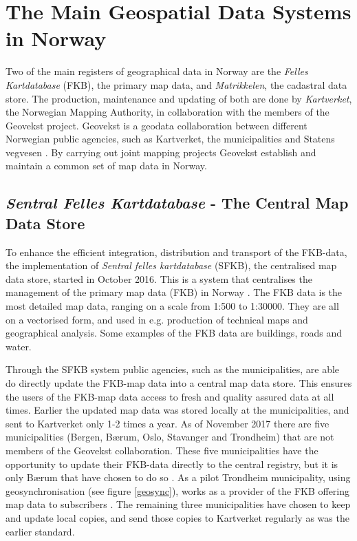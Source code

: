
\chapter{The Main Geospatial Data Systems in Norway}\label{chap:examples}
Two of the main registers of geographical data in Norway are the \textit{Felles Kartdatabase} (FKB), the primary map data,  and \textit{Matrikkelen}, the cadastral data store. The production, maintenance and updating of both are done by \textit{Kartverket}, the Norwegian Mapping Authority, in collaboration with the members of the Geovekst project. Geovekst is a geodata collaboration between different Norwegian public agencies, such as Kartverket, the municipalities and Statens vegvesen \citep{Kartverket2017a}. By carrying out joint mapping projects Geovekst establish and maintain a common set of map data in Norway. 

\section{\textit{Sentral Felles Kartdatabase} - The Central Map Data Store}\label{SFKB}
To enhance the efficient integration, distribution and transport of the FKB-data, the implementation of \textit{Sentral felles kartdatabase} (SFKB), the centralised map data store, started in October 2016. This is a system that centralises the management of the primary map data (FKB) in Norway \citep{Kartverket2017}. The FKB data is the most detailed map data, ranging on a scale from 1:500 to 1:30000. They are all on a vectorised form, and used in e.g. production of technical maps and geographical analysis. Some examples of the FKB data are buildings, roads and water. 

Through the SFKB system public agencies, such as the municipalities, are able do directly update the FKB-map data into a central map data store. This ensures the users of the FKB-map data access to fresh and quality assured data at all times. Earlier the updated map data was stored locally at the municipalities, and sent to Kartverket only 1-2 times a year. As of November 2017 there are five municipalities (Bergen, Bærum, Oslo, Stavanger and Trondheim) that are not members of the Geovekst collaboration. These five municipalities have the opportunity to update their FKB-data directly to the central registry, but it is only Bærum that have chosen to do so \citep{Kartverket2017}. As a pilot Trondheim municipality, using geosynchronisation (see figure \ref{geosync}), works as a provider of the FKB offering map data to subscribers \citep{Saether2016,Sandal2016}. The remaining three municipalities have chosen to keep and update local copies, and send those copies to Kartverket regularly as was the earlier standard.

